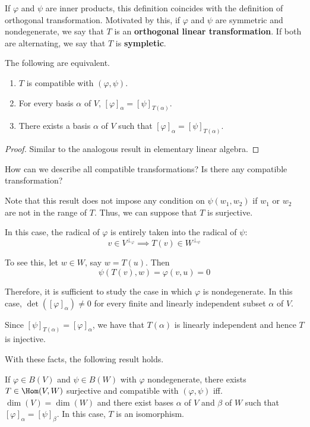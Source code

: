 If $\varphi$ and $\psi$ are inner products, this definition coincides with the definition of orthogonal transformation. Motivated by this, if $\varphi$ and $\psi$ are symmetric and nondegenerate, we say that $T$ is an \textbf{orthogonal linear transformation}. If both are alternating, we say that $T$ is \textbf{sympletic}. 

\begin{theorem}\label{thm:202301030953}
  The following are equivalent.
  \begin{enumerate}
    \item $T$ is compatible with $(\varphi, \psi)$.
    \item For every basis $\alpha$ of $V$, $[\varphi]_\alpha = [\psi]_{T(\alpha)}$.
    \item There exists a basis $\alpha$ of $V$ such that $[\varphi]_\alpha = [\psi]_{T(\alpha)}$.
  \end{enumerate}
\end{theorem}

\begin{proof}
  Similar to the analogous result in elementary linear algebra.
\end{proof}

How can we describe all compatible transformations? Is there any compatible transformation? 

Note that this result does not impose any condition on $\psi(w_1, w_2)$ if $w_1$ or $w_2$ are not in the range of $T$. Thus, we can suppose that $T$ is surjective.

In this case, the radical of $\varphi$ is entirely taken into the radical of $\psi$:
\[
  v \in V^{\perp_\varphi} \implies T(v) \in W^{\perp_\psi}
\]

To see this, let $w \in W$, say $w = T(u)$. Then
\[
  \psi(T(v),w) = \varphi(v,u) = 0
\]

Therefore, it is sufficient to study the case in which $\varphi$ is nondegenerate. In this case, $\det([\varphi]_\alpha) \neq 0$ for every finite and linearly independent subset $\alpha$ of $V$. 

Since $[\psi]_{T(\alpha)} = [\varphi]_\alpha$, we have that $T(\alpha)$ is linearly independent and hence $T$ is injective. 

With these facts, the following result holds.

\begin{theorem}
  If $\varphi \in B(V)$ and $\psi \in B(W)$ with $\varphi$ nondegenerate, there exists $T \in \Hom(V,W)$ surjective and compatible with $(\varphi, \psi)$ iff. $\dim(V) = \dim(W)$ and there exist bases $\alpha$ of $V$ and $\beta$ of $W$ such that $[\varphi]_\alpha = [\psi]_\beta$. In this case, $T$ is an isomorphism. 
\end{theorem}

